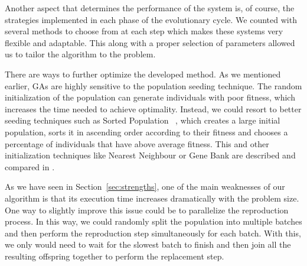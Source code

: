 \documentclass[anon]{CI}
\begin{document}
Another aspect that determines the performance of the system is, of course, the strategies implemented in each phase of the evolutionary cycle. We counted with several methods to choose from at each step which makes these systems very flexible and adaptable. This along with a proper selection of parameters allowed us to tailor the algorithm to the problem.

There are ways to further optimize the developed method. As we mentioned earlier, GAs are highly sensitive to the population seeding technique. The random initialization of the population can generate individuals with poor fitness, which increases the time needed to achieve optimality. Instead, we could resort to better seeding techniques such as Sorted Population ~\cite{yugay2008hybrid}, which creates a large initial population, sorts it in ascending order according to their fitness and chooses a percentage of individuals that have above average fitness. This and other initialization techniques like Nearest Neighbour or Gene Bank are described and compared in \cite{hassanat2018improved}.

As we have seen in Section~\ref{sec:strengths}, one of the main weaknesses of our algorithm is that its execution time increases dramatically with the problem size. One way to slightly improve this issue could be to parallelize the reproduction process. In this way, we could randomly split the population into multiple batches and then perform the reproduction step simultaneously for each batch. With this, we only would need to wait for the slowest batch to finish and then join all the resulting offspring together to perform the replacement step.


\clearpage


\end{document}
